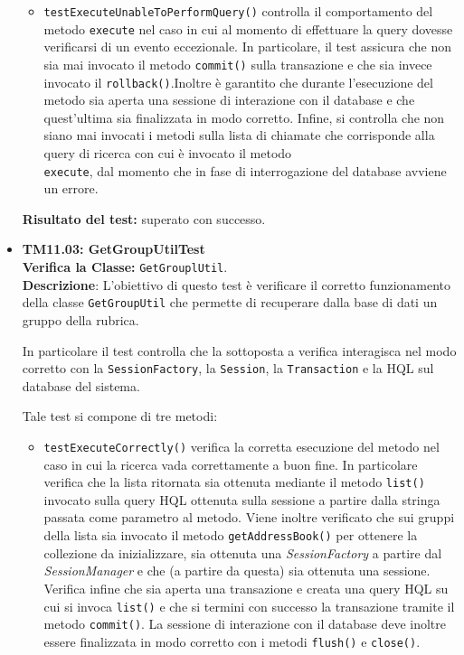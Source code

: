 \begin{itemize}
\begin{itemize}
\item \texttt{testExecuteUnableToPerformQuery()}
controlla il comportamento del metodo \texttt{execute} nel caso in cui al momento di effettuare la query dovesse verificarsi di un evento eccezionale. In particolare, il test assicura che non sia mai invocato il metodo \texttt{commit()} sulla transazione e che sia invece invocato il \texttt{rollback()}.Inoltre è garantito che durante l'esecuzione del metodo sia aperta una sessione di interazione con il database e che quest'ultima sia finalizzata in modo corretto. Infine, si controlla che non siano mai invocati i metodi sulla lista di chiamate che corrisponde alla query di ricerca con cui è invocato il metodo \\ \texttt{execute}, dal momento che in fase di interrogazione del database avviene un errore.

\end{itemize}
\textbf{Risultato del test:} superato con successo.

\item \textbf{TM11.03: GetGroupUtilTest}\\
\textbf{Verifica la Classe:} \texttt{GetGrouplUtil}.\\
\textbf{Descrizione}: L'obiettivo di questo test è verificare il corretto funzionamento della classe \texttt{GetGroupUtil} che permette di recuperare dalla base di dati un gruppo della rubrica.

In particolare il test controlla che la  sottoposta a verifica interagisca nel modo corretto con la \texttt{SessionFactory}, la \texttt{Session}, la \texttt{Transaction} e la  HQL sul database del sistema.

Tale test si compone di tre metodi:
\begin{itemize}
\item \texttt{testExecuteCorrectly()} verifica la corretta esecuzione del metodo nel caso in cui la ricerca vada correttamente a buon fine. In particolare verifica che la lista ritornata sia ottenuta mediante il metodo \texttt{list()} invocato sulla query HQL ottenuta sulla sessione a partire dalla stringa passata come parametro al metodo.
Viene inoltre verificato che sui gruppi della lista sia invocato il metodo \texttt{getAddressBook()} per ottenere la collezione da inizializzare, sia ottenuta una \textit{SessionFactory} a partire dal \textit{SessionManager} e che (a partire da questa) sia ottenuta una sessione.
Verifica infine che sia aperta una transazione e creata una query HQL su cui si invoca \texttt{list()} e che si termini con successo la transazione tramite il metodo \texttt{commit()}.
La sessione di interazione con il database deve inoltre essere finalizzata in modo corretto con i metodi \texttt{flush()} e \texttt{close()}.


\end{itemize}
\end{itemize}
